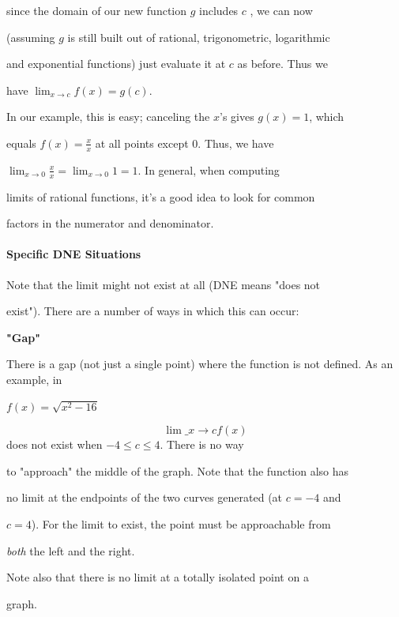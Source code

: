 since the domain of our new function $g$ includes $c$ , we can now

(assuming $g$ is still built out of rational, trigonometric, logarithmic

and exponential functions) just evaluate it at $c$ as before. Thus we

have $\lim_{x\to c}f(x)=g(c)$.



In our example, this is easy; canceling the $x$'s gives $g(x)=1$, which

equals $f(x)=\frac{x}{x}$ at all points except 0. Thus, we have

$\lim_{x\to0}\frac{x}{x}=\lim_{x\to0}1=1$. In general, when computing

limits of rational functions, it's a good idea to look for common

factors in the numerator and denominator.



\paragraph{Specific DNE Situations}



Note that the limit might not exist at all (DNE means "does not

exist"). There are a number of ways in which this can occur:



\textbf{"Gap"}



   There is a gap (not just a single point) where the function is not defined. As an example, in

   $f(x)=\sqrt{x^2-16}$



$$\lim\_{x\to c}f(x)$$ does not exist when $-4\le c\le4$. There is no way

to "approach" the middle of the graph. Note that the function also has

no limit at the endpoints of the two curves generated (at $c=-4$ and

$c=4$). For the limit to exist, the point must be approachable from

\textit{both} the left and the right.



   Note also that there is no limit at a totally isolated point on a

    graph.



